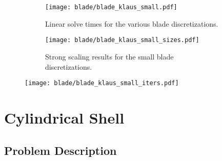 \begin{figure}[ht]
    \begin{subfigure}{\columnwidth}
        \centering
        \texttt{[image: blade/blade\_klaus\_small.pdf]}
        \caption{Linear solve times for the various blade discretizations.}
    \end{subfigure}
    \begin{subfigure}{\columnwidth}
        \centering
        \texttt{[image: blade/blade\_klaus\_small\_sizes.pdf]}
        \caption{Strong scaling results for the small blade discretizations.}
    \end{subfigure}
    \caption{}
    \label{fig:blade1}
\end{figure}

\begin{figure}[ht]
    \centering
    \texttt{[image: blade/blade\_klaus\_small\_iters.pdf]}
    \caption{}
    \label{fig:blade2}
\end{figure}

\clearpage

\section{Cylindrical Shell}
\subsection{Problem Description}

